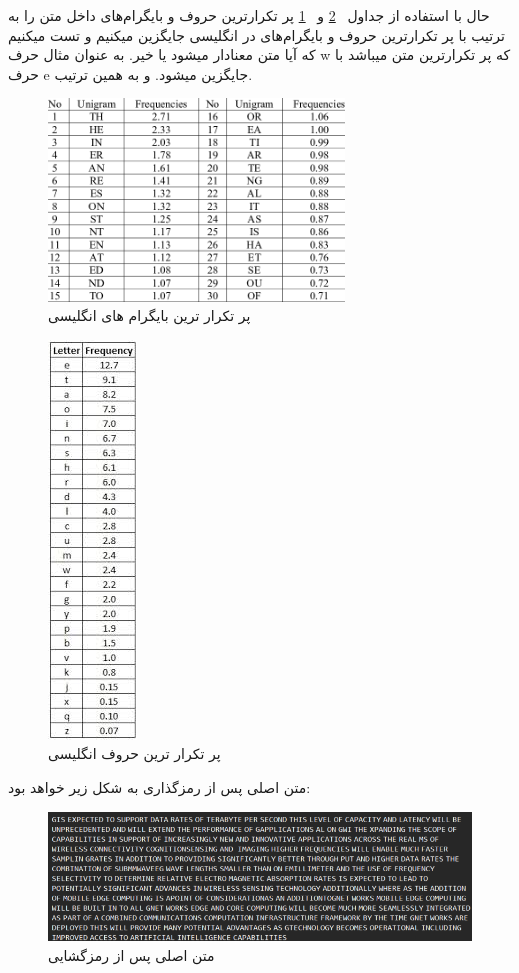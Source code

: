 \documentclass{article}
\begin{document}
حال با استفاده از جداول ~\ref{fig5} و ~\ref{fig6} پر تکرارترین حروف و بایگرام‌های داخل متن را به ترتیب با پر تکرارترین حروف و بایگرام‌های در انگلیسی جایگزین میکنیم و تست میکنیم که آیا متن معنادار میشود یا خیر. به عنوان مثال حرف w که پر تکرارترین متن میباشد با حرف e جایگزین میشود. و به همین ترتیب.\\
\begin{figure}[h]
\centering
\includegraphics[width=0.7\textwidth]{6.png}
\caption{پر تکرار ترین بایگرام های انگلیسی}
\label{fig6}
\end{figure}
\newpage
\begin{figure}[ht]
\centering
\includegraphics{5.png}
\caption{پر تکرار ترین حروف انگلیسی}
\label{fig5}
\end{figure}

متن اصلی پس از رمزگذاری به شکل زیر خواهد بود:
\begin{figure}[h]
\centering
\includegraphics{7.png}
\caption{متن اصلی پس از رمزگشایی}
\end{figure}
\end{document}
